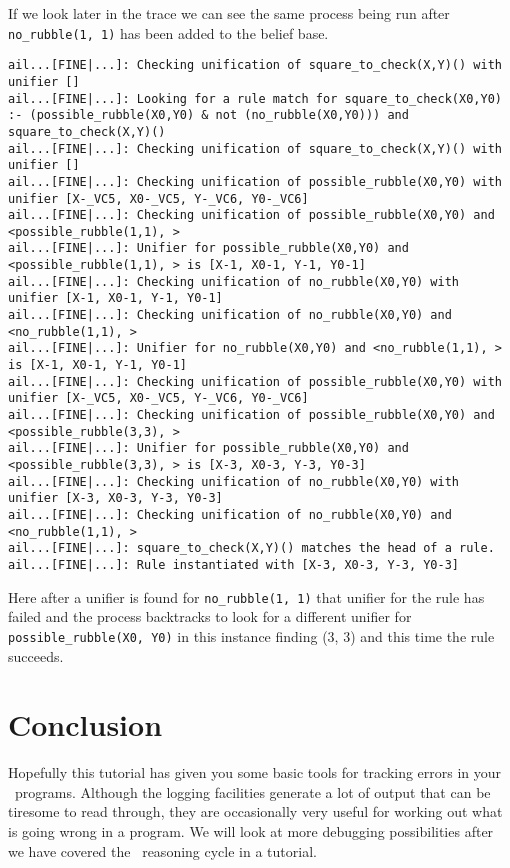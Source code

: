 If we look later in the trace we can see the same process being run after \texttt{no\_rubble(1, 1)} has been added to the belief base.

\begin{verbatim}
ail...[FINE|...]: Checking unification of square_to_check(X,Y)() with unifier [] 
ail...[FINE|...]: Looking for a rule match for square_to_check(X0,Y0) :- (possible_rubble(X0,Y0) & not (no_rubble(X0,Y0))) and square_to_check(X,Y)() 
ail...[FINE|...]: Checking unification of square_to_check(X,Y)() with unifier [] 
ail...[FINE|...]: Checking unification of possible_rubble(X0,Y0) with unifier [X-_VC5, X0-_VC5, Y-_VC6, Y0-_VC6] 
ail...[FINE|...]: Checking unification of possible_rubble(X0,Y0) and <possible_rubble(1,1), > 
ail...[FINE|...]: Unifier for possible_rubble(X0,Y0) and <possible_rubble(1,1), > is [X-1, X0-1, Y-1, Y0-1] 
ail...[FINE|...]: Checking unification of no_rubble(X0,Y0) with unifier [X-1, X0-1, Y-1, Y0-1] 
ail...[FINE|...]: Checking unification of no_rubble(X0,Y0) and <no_rubble(1,1), > 
ail...[FINE|...]: Unifier for no_rubble(X0,Y0) and <no_rubble(1,1), > is [X-1, X0-1, Y-1, Y0-1] 
ail...[FINE|...]: Checking unification of possible_rubble(X0,Y0) with unifier [X-_VC5, X0-_VC5, Y-_VC6, Y0-_VC6] 
ail...[FINE|...]: Checking unification of possible_rubble(X0,Y0) and <possible_rubble(3,3), > 
ail...[FINE|...]: Unifier for possible_rubble(X0,Y0) and <possible_rubble(3,3), > is [X-3, X0-3, Y-3, Y0-3] 
ail...[FINE|...]: Checking unification of no_rubble(X0,Y0) with unifier [X-3, X0-3, Y-3, Y0-3] 
ail...[FINE|...]: Checking unification of no_rubble(X0,Y0) and <no_rubble(1,1), > 
ail...[FINE|...]: square_to_check(X,Y)() matches the head of a rule. 
ail...[FINE|...]: Rule instantiated with [X-3, X0-3, Y-3, Y0-3] 
\end{verbatim}
\begin{sloppypar}
Here after a unifier is found for \texttt{no\_rubble(1, 1)} that unifier for the rule has failed and the process backtracks to look for a different unifier for \texttt{possible\_rubble(X0, Y0)} in this instance finding (3, 3) and this time the rule succeeds.
\end{sloppypar}

\section{Conclusion}
Hopefully this tutorial has given you some basic tools for tracking errors in your \gwendolen\ programs.  Although the logging facilities generate a lot of output that can be tiresome to read through, they are occasionally very useful for working out what is going wrong in a program.  We will look at more debugging possibilities after we have covered the \gwendolen\ reasoning cycle in a tutorial.

